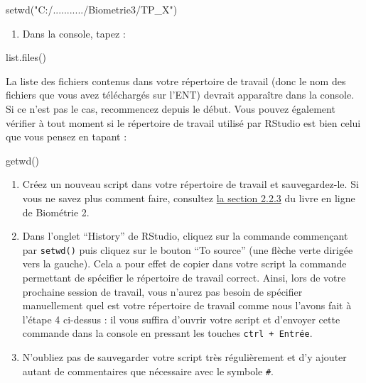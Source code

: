 \documentclass[
  a4paper,
]{article}
\newenvironment{Shaded}{\begin{snugshade}}{\end{snugshade}}
\newcommand{\FunctionTok}[1]{\textcolor[rgb]{0.39,0.29,0.61}{#1}}
\newcommand{\NormalTok}[1]{\textcolor[rgb]{0.12,0.11,0.11}{#1}}
\newcommand{\StringTok}[1]{\textcolor[rgb]{0.75,0.01,0.01}{#1}}
\providecommand{\tightlist}{%
  \setlength{\itemsep}{0pt}\setlength{\parskip}{0pt}}
\begin{document}
\begin{Shaded}
\begin{Highlighting}[]
\FunctionTok{setwd}\NormalTok{(}\StringTok{"C:/.........../Biometrie3/TP\_X"}\NormalTok{)}
\end{Highlighting}
\end{Shaded}

\begin{enumerate}
\def\labelenumi{\arabic{enumi}.}
\setcounter{enumi}{4}
\tightlist
\item
  Dans la console, tapez :
\end{enumerate}

\begin{Shaded}
\begin{Highlighting}[]
\FunctionTok{list.files}\NormalTok{()}
\end{Highlighting}
\end{Shaded}

La liste des fichiers contenus dans votre répertoire de travail (donc le nom des fichiers que vous avez téléchargés sur l'ENT) devrait apparaître dans la console. Si ce n'est pas le cas, recommencez depuis le début. Vous pouvez également vérifier à tout moment si le répertoire de travail utilisé par RStudio est bien celui que vous pensez en tapant :

\begin{Shaded}
\begin{Highlighting}[]
\FunctionTok{getwd}\NormalTok{()}
\end{Highlighting}
\end{Shaded}

\begin{enumerate}
\def\labelenumi{\arabic{enumi}.}
\setcounter{enumi}{5}
\tightlist
\item
  Créez un nouveau script dans votre répertoire de travail et sauvegardez-le. Si vous ne savez plus comment faire, consultez \href{https://besibo.github.io/Biometrie2/bases.html\#les-scripts}{la section 2.2.3} du livre en ligne de Biométrie 2.
\item
  Dans l'onglet ``History'' de RStudio, cliquez sur la commande commençant par \texttt{setwd()} puis cliquez sur le bouton ``To source'' (une flèche verte dirigée vers la gauche). Cela a pour effet de copier dans votre script la commande permettant de spécifier le répertoire de travail correct. Ainsi, lors de votre prochaine session de travail, vous n'aurez pas besoin de spécifier manuellement quel est votre répertoire de travail comme nous l'avons fait à l'étape 4 ci-dessus : il vous suffira d'ouvrir votre script et d'envoyer cette commande dans la console en pressant les touches \texttt{ctrl\ +\ Entrée}.
\item
  N'oubliez pas de sauvegarder votre script très régulièrement et d'y ajouter autant de commentaires que nécessaire avec le symbole \texttt{\#}.
\end{enumerate}
\end{document}
